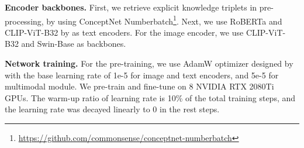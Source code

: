 \documentclass{article}
\begin{document}
\textbf{Encoder backbones.} First, we retrieve explicit knowledge triplets in pre-processing, by using ConceptNet Numberbatch\footnote{\url{https://github.com/commonsense/conceptnet-numberbatch}}. Next, we use RoBERTa \cite{liu2019roberta} and CLIP-ViT-B32 by \cite{radford2021learning} as text encoders. For the image encoder, we use CLIP-ViT-B32 \cite{radford2021learning} and Swin-Base \cite{liu2021Swin} as backbones.

\textbf{Network training.} For the pre-training, we use AdamW optimizer designed by \cite{loshchilov2018decoupled} with the base learning rate of 1e-5 for image and text encoders, and 5e-5 for multimodal module. We pre-train and fine-tune on 8 NVIDIA RTX 2080Ti GPUs. The warm-up ratio of learning rate is 10\% of the total training steps, and the learning rate was decayed linearly to 0 in the rest steps. 
\end{document}
